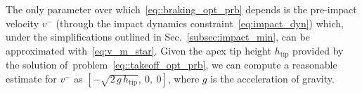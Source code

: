 The only parameter over which~\eqref{eq::braking_opt_prb} depends is the pre-impact velocity $v^{-}$ (through the impact dynamics constraint~\eqref{eq:impact_dyn}) which, under the simplifications outlined in Sec.~\ref{subsec:impact_min}, can be approximated with~\eqref{eq:v_m_star}. Given the apex tip height $h_{\mathrm{tip}}$ provided by the solution of~problem~\eqref{eq::takeoff_opt_prb}, we can compute a reasonable estimate for $v^{-}$ as $[-\sqrt{2\,g\,h_{\mathrm{tip}}},~0,~0]$, where $g$ is the acceleration of gravity.
